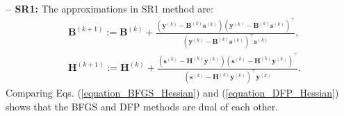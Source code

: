 \documentclass[lang=cn,10pt]{gorgeousnbook}
\numberwithin{equation}{section}%
\numberwithin{figure}{section}%
\begin{document}
\textbf{-- SR1: }
The approximations in SR1 method are:
\begin{equation}
\begin{aligned}
& \boldsymbol{B}^{(k+1)} := \boldsymbol{B}^{(k)} + \frac{(\boldsymbol{y}^{(k)} - \boldsymbol{B}^{(k)} \boldsymbol{s}^{(k)}) (\boldsymbol{y}^{(k)} - \boldsymbol{B}^{(k)} \boldsymbol{s}^{(k)})^\top}{(\boldsymbol{y}^{(k)} - \boldsymbol{B}^{(k)} \boldsymbol{s}^{(k)})^\top \boldsymbol{s}^{(k)}}, \\
& \boldsymbol{H}^{(k+1)} := \boldsymbol{H}^{(k)} + \frac{(\boldsymbol{s}^{(k)} - \boldsymbol{H}^{(k)} \boldsymbol{y}^{(k)}) (\boldsymbol{s}^{(k)} - \boldsymbol{H}^{(k)} \boldsymbol{y}^{(k)})^\top}{(\boldsymbol{s}^{(k)} - \boldsymbol{H}^{(k)} \boldsymbol{y}^{(k)})^\top \boldsymbol{y}^{(k)}}.
\end{aligned}
\end{equation}
Comparing Eqs. (\ref{equation_BFGS_Hessian}) and (\ref{equation_DFP_Hessian}) shows that the BFGS and DFP methods are dual of each other. 
\end{document}
